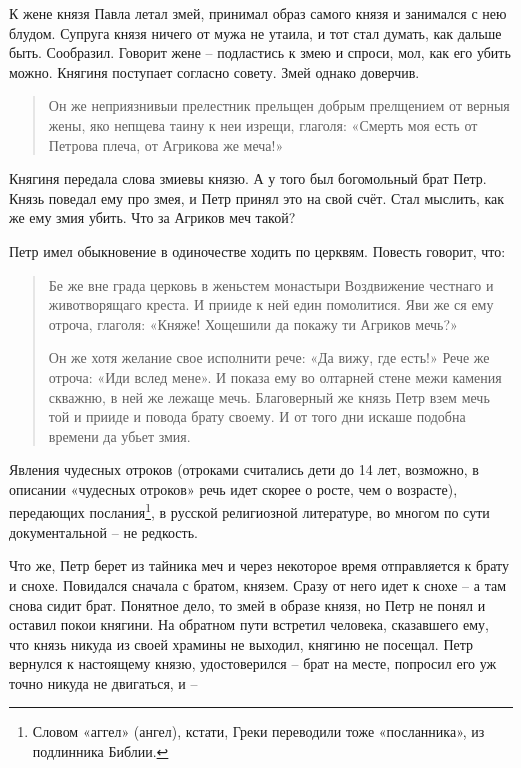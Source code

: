 К жене князя Павла летал змей, принимал образ самого князя и занимался с нею блудом. Супруга князя ничего от мужа не утаила, и тот стал думать, как дальше быть. Сообразил. Говорит жене – подластись к змею и спроси, мол, как его убить можно. Княгиня поступает согласно совету. Змей однако доверчив.

\begin{quotation}
Он же неприязнивыи прелестник прельщен добрым прелщением от верныя жены, яко непщева таину к неи изрещи, глаголя: «Смерть моя есть от Петрова плеча, от Агрикова же меча!»
\end{quotation}

Княгиня передала слова змиевы князю. А у того был богомольный брат Петр. Князь поведал ему про змея, и Петр принял это на свой счёт. Стал мыслить, как же ему змия убить. Что за Агриков меч такой?

Петр имел обыкновение в одиночестве ходить по церквям. Повесть говорит, что: 

\begin{quotation}
Бе же вне града церковь в женьстем монастыри Воздвижение честнаго и животворящаго креста. И прииде к ней един помолитися. Яви же ся ему отроча, глаголя: «Княже! Хощешили да покажу ти Агриков мечь?»

Он же хотя желание свое исполнити рече: «Да вижу, где есть!» Рече же отроча: «Иди вслед мене». И показа ему во олтарней стене межи камения скважню, в ней же лежаще мечь. Благоверный же князь Петр взем мечь той и прииде и повода брату своему. И от того дни искаше подобна времени да убьет змия.
\end{quotation}

Явления чудесных отроков (отроками считались дети до 14 лет, возможно, в описании «чудесных отроков» речь идет скорее о росте, чем о возрасте), передающих послания\footnote{Словом «аггел» (ангел), кстати, Греки переводили тоже «посланника», из подлинника Библии.}, в русской религиозной литературе, во многом по сути документальной – не редкость.

Что же, Петр берет из тайника меч и через некоторое время отправляется к брату и снохе. Повидался сначала с братом, князем. Сразу от него идет к снохе – а там снова сидит брат. Понятное дело, то змей в образе князя, но Петр не понял и оставил покои княгини. На обратном пути встретил человека, сказавшего ему, что князь никуда из своей храмины не выходил, княгиню не посещал. Петр вернулся к настоящему князю, удостоверился – брат на месте, попросил его уж точно никуда не двигаться, и – 

